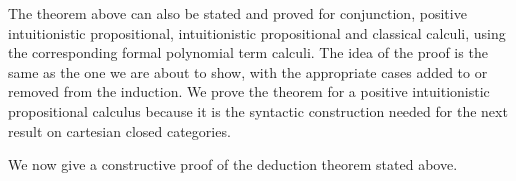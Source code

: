 \begin{remark}
    The theorem above can also be stated and proved for conjunction, positive intuitionistic propositional, intuitionistic propositional and classical calculi, using the corresponding formal polynomial term calculi.
    The idea of the proof is the same as the one we are about to show, with the appropriate cases added to or removed from the induction.\newline
    We prove the theorem for a positive intuitionistic propositional calculus because it is the syntactic construction needed for the next result on cartesian closed categories.
\end{remark}

We now give a constructive proof of the deduction theorem stated above.

